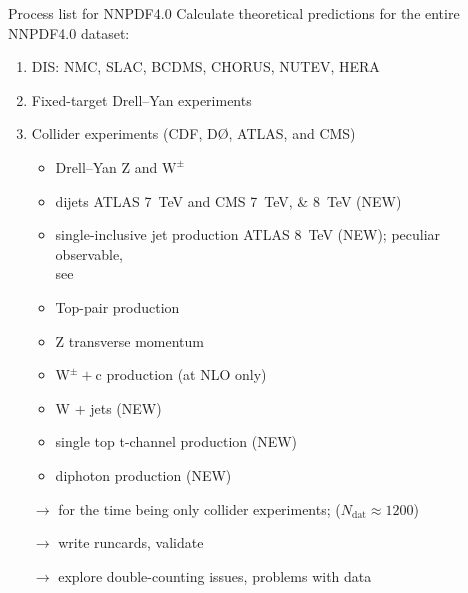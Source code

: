 \begin{frame}{Process list for NNPDF4.0}
\fontsize{9}{11}\selectfont
Calculate theoretical predictions for the entire NNPDF4.0 dataset:
\begin{enumerate}
\item DIS: NMC, SLAC, BCDMS, CHORUS, NUTEV, HERA
\item Fixed-target Drell--Yan experiments
\item Collider experiments (CDF, D{\O}, ATLAS, and CMS)
\begin{itemize}
\item Drell--Yan $\mathrm{Z}$ and $\mathrm{W}^\pm$
\item dijets ATLAS \SI{7}{\tera\electronvolt} and CMS \SIlist{7;8}{\tera\electronvolt} (NEW)
\item single-inclusive jet production ATLAS \SI{8}{\tera\electronvolt} (NEW); peculiar observable,\\
see 
\item Top-pair production
\item Z transverse momentum
\item $\mathrm{W}^\pm + \mathrm{c}$ production (at NLO only)
\item W + jets (NEW)
\item single top t-channel production (NEW)
\item diphoton production (NEW)
\end{itemize}
\end{enumerate}

\vspace*{\fill}

\begin{itemize}
\item[$\rightarrow$] for the time being \alert{only collider experiments}; ($N_\text{dat} \approx 1200$)\\
\item[$\rightarrow$] write runcards, validate\\
\item[$\rightarrow$] \alert{explore double-counting issues}, problems with data
\end{itemize}
\end{frame}

